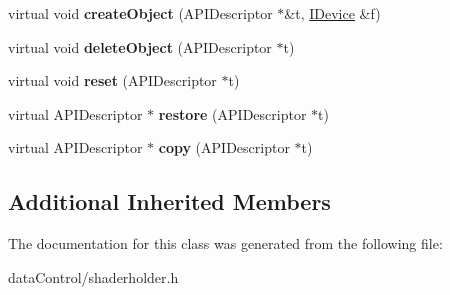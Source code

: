 \begin{DoxyCompactItemize}
\item 
\hypertarget{class_tempest_1_1_shader_holder_a3109ec642d879ade3cc419930ac08854}{virtual void {\bfseries create\+Object} (A\+P\+I\+Descriptor $\ast$\&t, \hyperlink{class_tempest_1_1_i_device}{I\+Device} \&f)}\label{class_tempest_1_1_shader_holder_a3109ec642d879ade3cc419930ac08854}

\item 
\hypertarget{class_tempest_1_1_shader_holder_a23a99f9b9fc6ddcad6d17c153596f2eb}{virtual void {\bfseries delete\+Object} (A\+P\+I\+Descriptor $\ast$t)}\label{class_tempest_1_1_shader_holder_a23a99f9b9fc6ddcad6d17c153596f2eb}

\item 
\hypertarget{class_tempest_1_1_shader_holder_ab825a5fa5c98b7e8d6e39f7b07f6a775}{virtual void {\bfseries reset} (A\+P\+I\+Descriptor $\ast$t)}\label{class_tempest_1_1_shader_holder_ab825a5fa5c98b7e8d6e39f7b07f6a775}

\item 
\hypertarget{class_tempest_1_1_shader_holder_aea7976bc878aa7d13c55b35da441aa3b}{virtual A\+P\+I\+Descriptor $\ast$ {\bfseries restore} (A\+P\+I\+Descriptor $\ast$t)}\label{class_tempest_1_1_shader_holder_aea7976bc878aa7d13c55b35da441aa3b}

\item 
\hypertarget{class_tempest_1_1_shader_holder_a44b0825926edf13bf11cddcb991269e1}{virtual A\+P\+I\+Descriptor $\ast$ {\bfseries copy} (A\+P\+I\+Descriptor $\ast$t)}\label{class_tempest_1_1_shader_holder_a44b0825926edf13bf11cddcb991269e1}

\end{DoxyCompactItemize}
\subsection*{Additional Inherited Members}


The documentation for this class was generated from the following file\+:\begin{DoxyCompactItemize}
\item 
data\+Control/shaderholder.\+h\end{DoxyCompactItemize}
